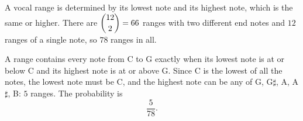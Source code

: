 A vocal range is determined by its lowest note and its highest note, which is the same or higher. There are $\dbinom{12}{2}=66$ ranges with two different end notes and $12$ ranges of a single note, so $78$ ranges in all.

A range contains every note from C to G exactly when its lowest note is at or below C and its highest note is at or above G. Since C is the lowest of all the notes, the lowest note must be C, and the highest note can be any of G, G$\sharp$, A, A$\sharp$, B: $5$ ranges. The probability is
\[\boxed{\dfrac{5}{78}}.\]
